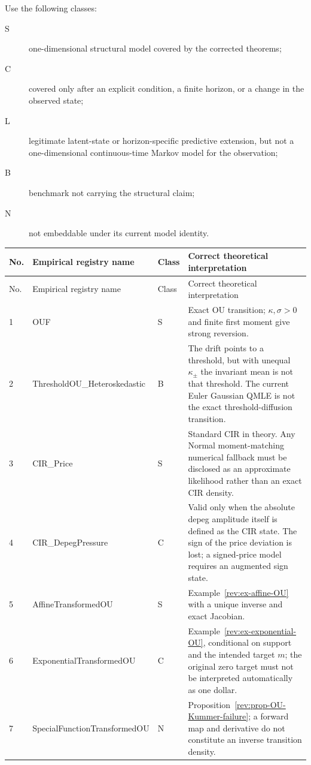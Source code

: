 \documentclass[11pt]{article}
\theoremstyle{remark}
\begin{document}
Use the following classes:
\begin{description}
\item[S] one-dimensional structural model covered by the corrected theorems;
\item[C] covered only after an explicit condition, a finite horizon, or a
change in the observed state;
\item[L] legitimate latent-state or horizon-specific predictive extension,
but not a one-dimensional continuous-time Markov model for the observation;
\item[B] benchmark not carrying the structural claim;
\item[N] not embeddable under its current model identity.
\end{description}

\scriptsize
\begin{longtable}{p{}p{}p{}p{}}
\toprule
No. & Empirical registry name & Class & Correct theoretical interpretation\\
\midrule
\endfirsthead
\toprule
No. & Empirical registry name & Class & Correct theoretical interpretation\\
\midrule
\endhead
1 & OUF & S & Exact OU transition; $\kappa,\sigma>0$ and finite first moment give strong reversion.\\
2 & ThresholdOU\_\allowbreak{}Heteroskedastic & B & The drift points to a threshold, but with unequal $\kappa_\pm$ the invariant mean is not that threshold.  The current Euler Gaussian QMLE is not the exact threshold-diffusion transition.\\
3 & CIR\_Price & S & Standard CIR in theory.  Any Normal moment-matching numerical fallback must be disclosed as an approximate likelihood rather than an exact CIR density.\\
4 & CIR\_\allowbreak{}DepegPressure & C & Valid only when the absolute depeg amplitude itself is defined as the CIR state.  The sign of the price deviation is lost; a signed-price model requires an augmented sign state.\\
5 & AffineTransformedOU & S & Example~\ref{rev:ex-affine-OU} with a unique inverse and exact Jacobian.\\
6 & Exponential\allowbreak{}TransformedOU & C & Example~\ref{rev:ex-exponential-OU}, conditional on support and the intended target $m$; the original zero target must not be interpreted automatically as one dollar.\\
7 & SpecialFunction\allowbreak{}TransformedOU & N & Proposition~\ref{rev:prop-OU-Kummer-failure}; a forward map and derivative do not constitute an inverse transition density.\\

\end{longtable}
\end{document}
